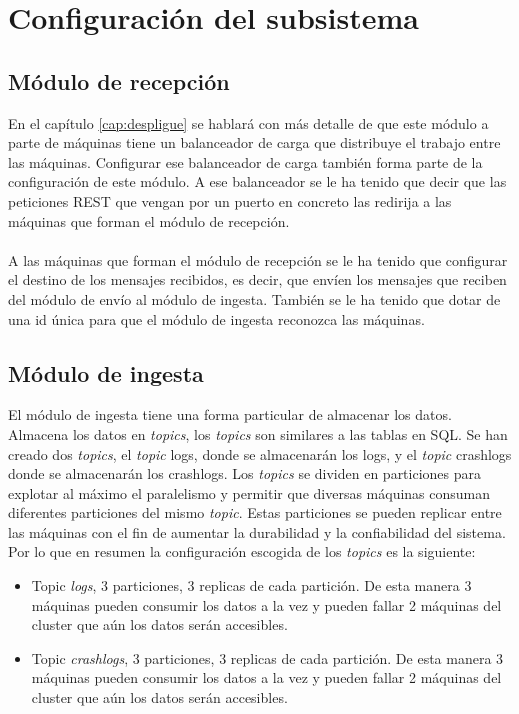 \section{Configuración del subsistema}

\subsection{Módulo de recepción}

En el capítulo \ref{cap:despligue} se hablará con más detalle de que este módulo a parte de máquinas tiene un balanceador de carga que distribuye el trabajo entre las máquinas. Configurar ese balanceador de carga también forma parte de la configuración de este módulo. A ese balanceador se le ha tenido que decir que las peticiones REST que vengan por un puerto en concreto las redirija a las máquinas que forman el módulo de recepción.
\\\\
A las máquinas que forman el módulo de recepción se le ha tenido que configurar el destino de los mensajes recibidos, es decir, que envíen los mensajes que reciben del módulo de envío al módulo de ingesta. También se le ha tenido que dotar de una id única para que el módulo de ingesta reconozca las máquinas.

\subsection{Módulo de ingesta}

El módulo de ingesta tiene una forma particular de almacenar los datos. Almacena los datos en \textit{topics}, los \textit{topics} son similares a las tablas en SQL. Se han creado dos \textit{topics}, el \textit{topic} logs, donde se almacenarán los logs, y el \textit{topic} crashlogs donde se almacenarán los crashlogs. Los \textit{topics} se dividen en particiones para explotar al máximo el paralelismo y permitir que diversas máquinas consuman diferentes particiones del mismo \textit{topic}. Estas particiones se pueden replicar entre las máquinas con el fin de aumentar la durabilidad y la confiabilidad del sistema. Por lo que en resumen la configuración escogida de los \textit{topics} es la siguiente:

\begin{itemize}
	\item Topic \textit{logs}, 3 particiones, 3 replicas de cada partición. De esta manera 3 máquinas pueden consumir los datos a la vez y pueden fallar 2 máquinas del cluster que aún los datos serán accesibles.
	\item Topic \textit{crashlogs}, 3 particiones, 3 replicas de cada partición. De esta manera 3 máquinas pueden consumir los datos a la vez y pueden fallar 2 máquinas del cluster que aún los datos serán accesibles.
\end{itemize}


